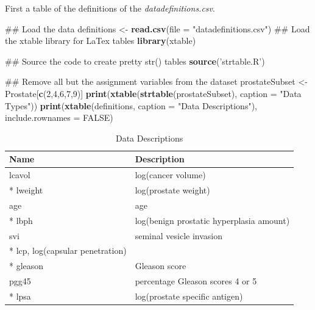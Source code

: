 \documentclass[]{article}
\newenvironment{Shaded}{\begin{snugshade}}{\end{snugshade}}
\newcommand{\KeywordTok}[1]{\textcolor[rgb]{0.13,0.29,0.53}{\textbf{#1}}}
\newcommand{\DataTypeTok}[1]{\textcolor[rgb]{0.13,0.29,0.53}{#1}}
\newcommand{\DecValTok}[1]{\textcolor[rgb]{0.00,0.00,0.81}{#1}}
\newcommand{\StringTok}[1]{\textcolor[rgb]{0.31,0.60,0.02}{#1}}
\newcommand{\OtherTok}[1]{\textcolor[rgb]{0.56,0.35,0.01}{#1}}
\newcommand{\NormalTok}[1]{#1}
\renewcommand{\&}{and}
\begin{document}
First a table of the definitions of the \emph{datadefinitions.csv}.

\begin{Shaded}
\begin{Highlighting}[]
\NormalTok{## Load the data}
\NormalTok{definitions <-}\StringTok{ }\KeywordTok{read.csv}\NormalTok{(}\DataTypeTok{file =} \StringTok{"datadefinitions.csv"}\NormalTok{)}
\NormalTok{## Load the xtable library for LaTex tables}
\KeywordTok{library}\NormalTok{(xtable)}

\NormalTok{## Source the code to create pretty str() tables}
\KeywordTok{source}\NormalTok{(}\StringTok{'strtable.R'}\NormalTok{)}

\NormalTok{## Remove all but the assignment variables from the dataset}
\NormalTok{prostateSubset <-}\StringTok{ }\NormalTok{Prostate[}\KeywordTok{c}\NormalTok{(}\DecValTok{2}\NormalTok{,}\DecValTok{4}\NormalTok{,}\DecValTok{6}\NormalTok{,}\DecValTok{7}\NormalTok{,}\DecValTok{9}\NormalTok{)]}
\KeywordTok{print}\NormalTok{(}\KeywordTok{xtable}\NormalTok{(}\KeywordTok{strtable}\NormalTok{(prostateSubset), }\DataTypeTok{caption =} \StringTok{"Data Types"}\NormalTok{))}
\KeywordTok{print}\NormalTok{(}\KeywordTok{xtable}\NormalTok{(definitions, }\DataTypeTok{caption =} \StringTok{"Data Descriptions"}\NormalTok{), }
      \DataTypeTok{include.rownames =} \OtherTok{FALSE}\NormalTok{)}
\end{Highlighting}
\end{Shaded}

\begin{table}[htb]
\centering
\caption{Data Descriptions} 
\vspace{0.2cm}
\begin{tabular}{ll}
  \hline
Name & Description \\ 
  \hline
lcavol &  log(cancer volume) \\ 
  * lweight &  log(prostate weight) \\ 
  age &  age \\ 
  * lbph &  log(benign prostatic hyperplasia amount) \\ 
  svi &  seminal vesicle invasion \\ 
  * lcp, log(capsular penetration) \\
  * gleason &  Gleason score \\ 
  pgg45 &  percentage Gleason scores 4 or 5 \\ 
  * lpsa &  log(prostate specific antigen) \\ 
   \hline
\end{tabular}
\end{table}
\end{document}
